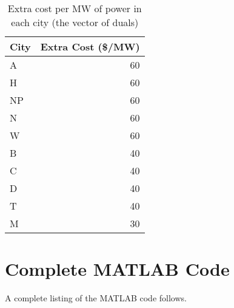 \documentclass[11pt]{article}
\begin{document}
\begin{table}[h]
	\centering
	\begin{tabular}{@{}lr@{}}
	\toprule
	City & Extra Cost (\$/MW) \\ \midrule
	A       & 60              \\
	H       & 60              \\
	NP      & 60              \\
	N       & 60              \\
	W       & 60              \\
	B       & 40              \\
	C       & 40              \\
	D       & 40              \\
	T       & 40              \\
	M       & 30              \\ \bottomrule
	\end{tabular}
	\caption{Extra cost per MW of power in each city (the vector of duals)}
\end{table}

\newpage\phantom{hi marker :)}

\newpage
\section*{Complete MATLAB Code}
A complete listing of the MATLAB code follows. 

\inputminted{matlab}{main.m}
\end{document}
